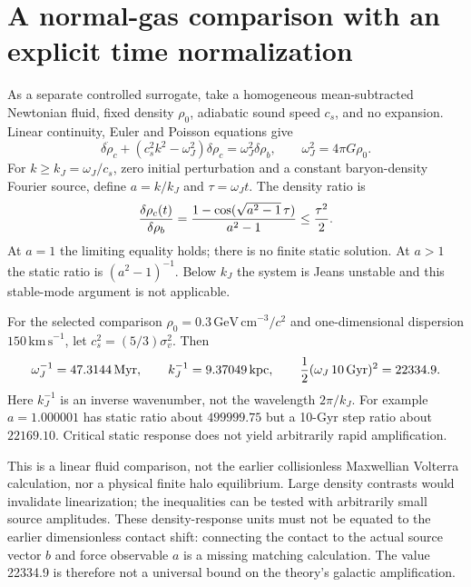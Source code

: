 \documentclass[11pt]{article}
\begin{document}
\section{A normal-gas comparison with an explicit time normalization}
As a separate controlled surrogate, take a homogeneous mean-subtracted
Newtonian fluid, fixed density $\rho_0$, adiabatic sound speed $c_s$, and
no expansion. Linear continuity, Euler and Poisson equations give
\begin{equation}
 \ddot{\delta\rho_c}+(c_s^2k^2-\omega_J^2)\delta\rho_c
       =\omega_J^2\delta\rho_b,
 \qquad \omega_J^2=4\pi G\rho_0.
\end{equation}
For $k\geq k_J=\omega_J/c_s$, zero initial perturbation and a constant
baryon-density Fourier source, define $a=k/k_J$ and $\tau=\omega_Jt$.
The density ratio is
\begin{equation}
 {\delta\rho_c(t)\over\delta\rho_b}
 ={1-\cos(\sqrt{a^2-1}\,\tau)\over a^2-1}
 \leq {\tau^2\over2}.
 \label{pr:gas}
\end{equation}
At $a=1$ the limiting equality holds; there is no finite static solution.
At $a>1$ the static ratio is $(a^2-1)^{-1}$. Below $k_J$ the system is
Jeans unstable and this stable-mode argument is not applicable.

For the selected comparison $\rho_0=0.3\,\mathrm{GeV\,cm}^{-3}/c^2$
and one-dimensional dispersion $150\,\mathrm{km\,s}^{-1}$, let
$c_s^2=(5/3)\sigma_v^2$. Then
\begin{equation}
 \omega_J^{-1}=47.3144\,\mathrm{Myr},\qquad
 k_J^{-1}=9.37049\,\mathrm{kpc},\qquad
 {1\over2}(\omega_J\,10\,\mathrm{Gyr})^2=22334.9.
\end{equation}
Here $k_J^{-1}$ is an inverse wavenumber, not the wavelength $2\pi/k_J$.
For example $a=1.000001$ has static ratio about $499999.75$ but a
10-Gyr step ratio about $22169.10$. Critical static response does not
yield arbitrarily rapid amplification.

This is a linear fluid comparison, not the earlier collisionless Maxwellian
Volterra calculation, nor a physical finite halo equilibrium. Large density
contrasts would invalidate linearization; the inequalities can be tested
with arbitrarily small source amplitudes. These density-response units
must not be equated to the earlier dimensionless contact shift: connecting
the contact to the actual source vector $b$ and force observable $a$ is a
missing matching calculation. The value 22334.9 is therefore not a
universal bound on the theory's galactic amplification.
\end{document}
